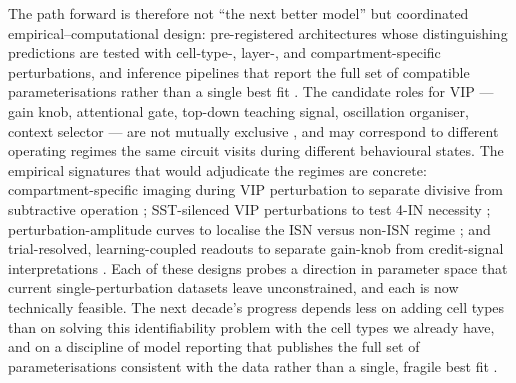 \documentclass[11pt]{article}
\begin{document}
The path forward is therefore not ``the next better model'' but coordinated empirical--computational design: pre-registered architectures whose distinguishing predictions are tested with cell-type-, layer-, and compartment-specific perturbations, and inference pipelines that report the full set of compatible parameterisations rather than a single best fit \citep{Dellal2025, Reimann2026, Sancheztodo2026, Moreni2025a}. The candidate roles for VIP --- gain knob, attentional gate, top-down teaching signal, oscillation organiser, context selector --- are not mutually exclusive \citep{Hertag2019, Garciadelmolino2017, Wagatsuma2023, Lee2025, Furutachi2024, Millman2020, Shen2023, Yang2016, Hertag2020, Hertag2021}, and may correspond to different operating regimes the same circuit visits during different behavioural states. The empirical signatures that would adjudicate the regimes are concrete: compartment-specific imaging during VIP perturbation to separate divisive from subtractive operation \citep{Bilash2023, Lenkey2025, Reimann2026}; SST-silenced VIP perturbations to test 4-IN necessity \citep{Iqbal2025, Hartung2024, Vighagen2021}; perturbation-amplitude curves to localise the ISN versus non-ISN regime \citep{Garciadelmolino2017, Sanzeni2020}; and trial-resolved, learning-coupled readouts to separate gain-knob from credit-signal interpretations \citep{Lee2025, Hertag2020, Hertag2021, Chevy2024}. Each of these designs probes a direction in parameter space that current single-perturbation datasets leave unconstrained, and each is now technically feasible. The next decade's progress depends less on adding cell types than on solving this identifiability problem with the cell types we already have, and on a discipline of model reporting that publishes the full set of parameterisations consistent with the data rather than a single, fragile best fit .
\end{document}
